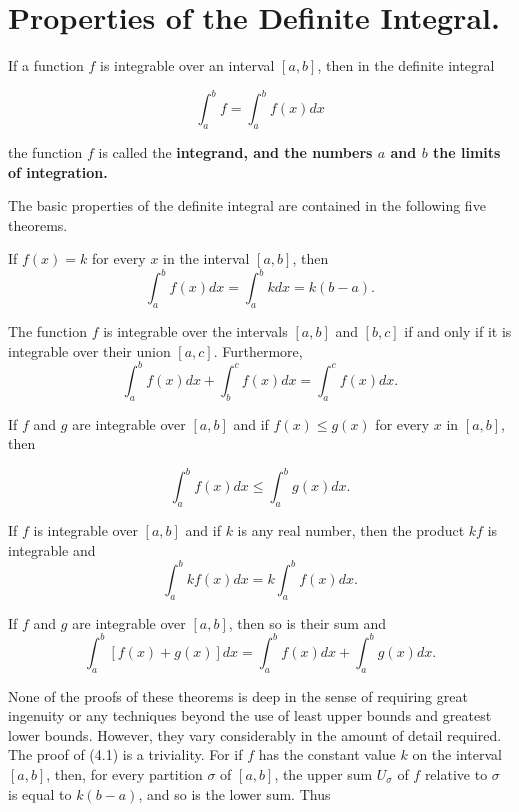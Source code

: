 \section{Properties of the Definite Integral.} 
If a function $f$ is integrable over an interval $[a, b]$, then in the definite integral 

$$
\int_{a}^{b} f = \int_{a}^{b} f(x) dx
$$

\noindent the function $f$ is called the \bf{integrand}, \rm{and the numbers $a$ and $b$ the} \bf{limits of integration}.

\rm{The basic properties of the definite integral are contained in the following five theorems.}

 
\begin{theorem} %
If $f (x) = k$ for every $x$ in the interval $[a, b]$, then 
$$
\int_{a}^{b} f(x) dx = \int_{a}^{b} k dx = k(b - a).
$$
\end{theorem}

\begin{theorem} %
The function $f$ is integrable over the intervals $[a, b]$ and $[b, c]$ if and only if it is integrable over their union $[a, c]$. Furthermore,
$$
\int_{a}^{b} f(x) dx + \int_{b}^{c} f(x) dx = \int_{a}^{c} f(x) dx.
$$
\end{theorem}

\begin{theorem} %
If $f$ and $g$ are integrable over $[a, b]$ and if $f (x) \leq g(x)$ for every $x$ in $[a, b]$, then

$$
\int_{a}^{b} f(x)dx \leq  \int_{a}^{b} g(x)dx.
$$
\end{theorem}

\begin{theorem} %
If $f$ is integrable over $[a, b]$ and if $k$ is any real number, then the product $kf$ is integrable and
$$
\int_{a}^{b} k f (x) dx = k \int_{a}^{b} f (x) dx.
$$
\end{theorem}

 
\begin{theorem} %
If $f$ and $g$ are integrable over $[a, b]$, then so is their sum and
$$
\int_{a}^{b} [f(x) + g(x)] dx = \int_{a}^{b} f(x) dx + \int_{a}^{b} g(x) dx.
$$
\end{theorem}

None of the proofs of these theorems is deep in the sense of requiring great ingenuity or any techniques beyond the use of least upper bounds and greatest lower bounds. However, they vary considerably in the amount of detail required. The proof of (4.1) is a triviality. For if $f$ has the constant value $k$ on the interval $[a, b]$, then, for every partition $\sigma$ of $[a, b]$, the upper sum $U_{\sigma}$ of $f$ relative to $\sigma$ is equal to $k(b - a)$, and so is the lower sum. Thus

